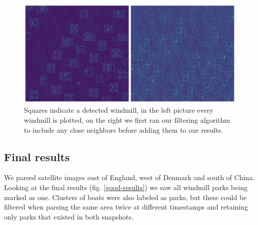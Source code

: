\begin{figure}[ht]
\begin{center}
\centerline{\includegraphics[width=\columnwidth]{images/detection-filtering.png}}
\caption{Squares indicate a detected windmill, in the left picture every windmill is plotted, on the right we first ran our filtering algorithm to include any close neighbors before adding them to our results.}
\label{detection-filtering}
\end{center}
\end{figure}

\subsection{Final results}

We parsed satellite images east of England, west of Denmark and south of China. Looking at the final results (fig. \ref{good-results}) we saw all windmill parks being marked as one. Clusters of boats were also labeled as parks, but these could be filtered when parsing the same area twice at different timestamps and retaining only parks that existed in both snapshots.

